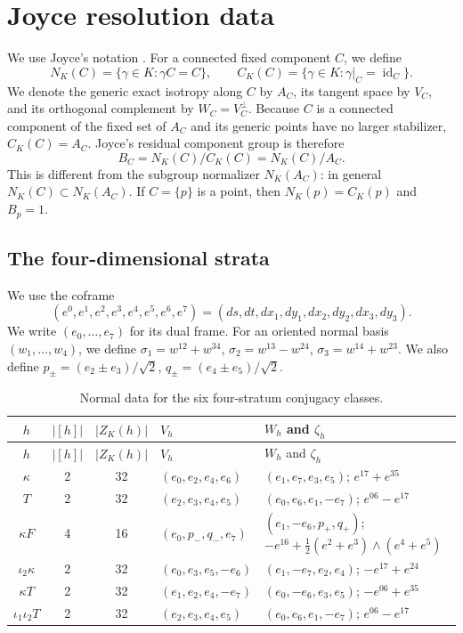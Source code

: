\documentclass[11pt]{article}
\theoremstyle{remark}\newtheorem{remark}[theorem]{Remark}
\newcommand{\id}{\operatorname{id}}
\begin{document}
\section{Joyce resolution data}
We use Joyce's notation \cite[Definition 13.2.2]{JoyceBook}.  For a
connected fixed component $C$, we define
\[
 N_K(C)=\{\gamma\in K:\gamma C=C\},\qquad
 C_K(C)=\{\gamma\in K:\gamma|_C=\id_C\}.
\]
We denote the generic exact isotropy along $C$ by $A_C$, its tangent space
by $V_C$, and its orthogonal complement by $W_C=V_C^\perp$.  Because $C$ is a connected component of the
fixed set of $A_C$ and its generic points have no larger stabilizer,
$C_K(C)=A_C$.  Joyce's residual component group is therefore
\begin{equation}\label{eq:component-group}
 B_C=N_K(C)/C_K(C)=N_K(C)/A_C.
\end{equation}
This is different from the subgroup normalizer $N_K(A_C)$: in general
$N_K(C)\subset N_K(A_C)$.  If $C=\{p\}$ is a point, then
$N_K(p)=C_K(p)$ and $B_p=1$.

\subsection{The four-dimensional strata}
We use the coframe
\begin{equation}\label{eq:e-coframe}
(e^0,e^1,e^2,e^3,e^4,e^5,e^6,e^7)
=(ds,dt,dx_1,dy_1,dx_2,dy_2,dx_3,dy_3).
\end{equation}
We write $(e_0,\ldots,e_7)$ for its dual frame.  For an oriented normal
basis $(w_1,\ldots,w_4)$, we define
$\sigma_1=w^{12}+w^{34}$, $\sigma_2=w^{13}-w^{24}$,
$\sigma_3=w^{14}+w^{23}$.  We also define
$p_\pm=(e_2\pm e_3)/\sqrt2$, $q_\pm=(e_4\pm e_5)/\sqrt2$.

\begin{longtable}{@{}c c c >{\raggedright\arraybackslash}p{}
>{\raggedright\arraybackslash}p{}@{}}
\caption{Normal data for the six four-stratum conjugacy classes.}
\label{tab:rdata4}\\
\toprule $h$&$|[h]|$&$|Z_K(h)|$&$V_h$&$W_h$ and $\zeta_h$\\\midrule\endfirsthead
\toprule $h$&$|[h]|$&$|Z_K(h)|$&$V_h$&$W_h$ and $\zeta_h$\\\midrule\endhead
$\kappa$&2&32&$(e_0,e_2,e_4,e_6)$&$(e_1,e_7,e_3,e_5)$; $e^{17}+e^{35}$\\
$T$&2&32&$(e_2,e_3,e_4,e_5)$&$(e_0,e_6,e_1,-e_7)$; $e^{06}-e^{17}$\\
$\kappa F$&4&16&$(e_0,p_-,q_-,e_7)$&$(e_1,-e_6,p_+,q_+)$;
$-e^{16}+\frac12(e^2+e^3)\wedge(e^4+e^5)$\\
$\iota_2\kappa$&2&32&$(e_0,e_3,e_5,-e_6)$&$(e_1,-e_7,e_2,e_4)$; $-e^{17}+e^{24}$\\
$\kappa T$&2&32&$(e_1,e_2,e_4,-e_7)$&$(e_0,-e_6,e_3,e_5)$; $-e^{06}+e^{35}$\\
$\iota_1\iota_2T$&2&32&$(e_2,e_3,e_4,e_5)$&$(e_0,e_6,e_1,-e_7)$; $e^{06}-e^{17}$\\
\bottomrule
\end{longtable}
\end{document}
